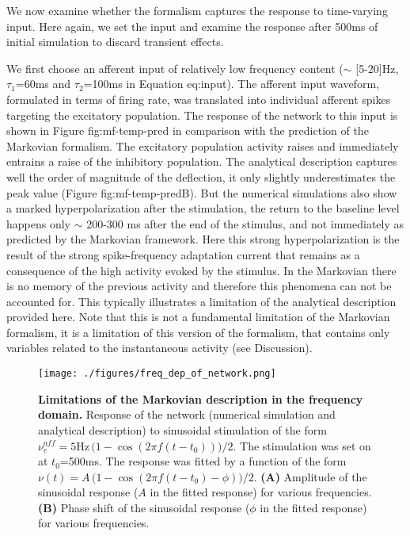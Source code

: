 \documentclass[8pt, colorlinks, a4paper]{article}
\renewcommand\ref{}
\begin{document}
We now examine whether the formalism captures the response to
time-varying input. Here again, we set the input and examine the
response after 500ms of initial simulation to discard transient
effects.

We first choose an afferent input of relatively low frequency content
(\(\sim\) [5-20]Hz, \( \tau_1 \)=60ms and \( \tau_2 \)=100ms in
Equation \ref{eq:input}). The afferent input waveform, formulated in terms
of firing rate, was translated into individual afferent spikes
targeting the excitatory population. The response of the network to
this input is shown in Figure \ref{fig:mf-temp-pred} in comparison with the
prediction of the Markovian formalism. The excitatory population
activity raises and immediately entrains a raise of the inhibitory
population. The analytical description captures well the order of
magnitude of the deflection, it only slightly underestimates the peak
value (Figure \ref{fig:mf-temp-pred}B). But the numerical simulations also
show a marked hyperpolarization after the stimulation, the return to
the baseline level happens only \(\sim\) 200-300 ms after the end of
the stimulus, and not immediately as predicted by the Markovian
framework. Here this strong hyperpolarization is the result of the
strong spike-frequency adaptation current that remains as a
consequence of the high activity evoked by the stimulus. In the
Markovian there is no memory of the previous activity and therefore
this phenomena can not be accounted for. This typically illustrates a
limitation of the analytical description provided here. Note that this
is not a fundamental limitation of the Markovian formalism, it is a
limitation of this version of the formalism, that contains only
variables related to the instantaneous activity (see Discussion).

\begin{figure}[tb!]
\centering
\texttt{[image: ./figures/freq\_dep\_of\_network.png]}
\caption{\label{fig:mf-freq-dep}\textbf{Limitations of the Markovian description in the frequency domain.} Response of the network (numerical simulation and analytical description) to sinusoidal stimulation of the form \(\nu_e^{aff} = 5\mathrm{Hz} \, \big(1-\cos(2 \pi f (t-t_0))\big)/2\). The stimulation was set on at \(t_0\)=500ms. The response was fitted by a function of the form  \(\nu(t) = A \, \big(1-\cos(2 \pi f (t-t_0) - \phi)\big)/2\). \textbf{(A)} Amplitude of the sinusoidal response (\(A\) in the fitted response) for various frequencies. \textbf{(B)} Phase shift of the sinusoidal response (\(\phi\) in the fitted response) for various frequencies.}
\end{figure}
\end{document}
